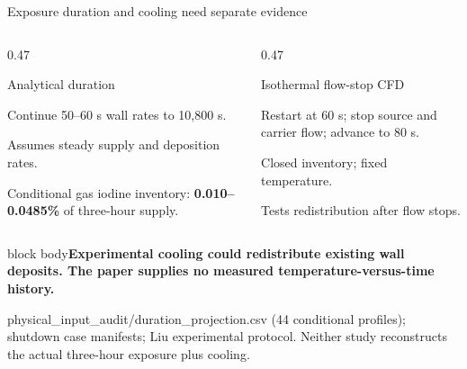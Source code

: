 \documentclass[aspectratio=169,10pt]{beamer}
\newcommand{\sources}[1]{\par\vfill{\raggedright\fontsize{6.2}{7.5}\selectfont\color{PSIgray}#1\par}}
\newcommand{\takeaway}[1]{\par\vspace{0.2em}\begin{beamercolorbox}[sep=0.4em,wd=\linewidth]{block body}{\small\textbf{#1}}\end{beamercolorbox}}
\begin{document}
\begin{frame}[t]{Exposure duration and cooling need separate evidence}
  \begin{columns}[t,onlytextwidth]
    \begin{column}{0.47\textwidth}
      \begin{block}{Analytical duration}
        \small\raggedright Continue 50--60 s wall rates to 10,800 s.\par\vspace{0.5em}
        Assumes steady supply and deposition rates.\par\vspace{0.5em}
        Conditional gas iodine inventory: \textbf{0.010--0.0485\%} of three-hour supply.
      \end{block}
    \end{column}
    \begin{column}{0.47\textwidth}
      \begin{block}{Isothermal flow-stop CFD}
        \small\raggedright Restart at 60 s; stop source and carrier flow; advance to 80 s.\par\vspace{0.5em}
        Closed inventory; fixed temperature.\par\vspace{0.5em}
        Tests redistribution after flow stops.
      \end{block}
    \end{column}
  \end{columns}
  \takeaway{Experimental cooling could redistribute existing wall deposits. The paper supplies no measured temperature-versus-time history.}
  \sources{physical\_input\_audit/duration\_projection.csv (44 conditional profiles); shutdown case manifests; Liu experimental protocol. Neither study reconstructs the actual three-hour exposure plus cooling.}
\end{frame}
\end{document}
